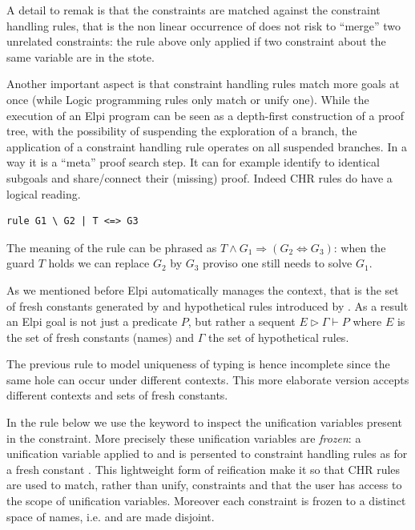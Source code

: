 \documentclass[a4paper, 11pt]{book}
\begin{document}
A detail to remak is that the constraints are matched against
the constraint handling rules, that is the non linear occurrence
of  does not risk to ``merge'' two unrelated constraints:
the rule above only applied if two constraint about the same variable
are in the stote.

Another important aspect is that constraint handling rules
match more goals at once (while Logic programming rules
only match or unify one). While the execution of an Elpi program
can be seen as a depth-first construction of a proof tree, with
the possibility of suspending the exploration of a branch, the
application of a constraint handling rule operates on all suspended
branches. In a way it is a ``meta'' proof search step. It can for
example identify to identical subgoals and share/connect their (missing)
proof. Indeed CHR rules do have a logical reading.

\begin{verbatim}
rule G1 \ G2 | T <=> G3
\end{verbatim}

The meaning of the rule can be phrased as $T \land G_1 \Rightarrow (G_2 \Leftrightarrow G_3)$:
when the guard $T$ holds we can replace $G_2$ by $G_3$ proviso one still
needs to solve $G_1$.
  
As we mentioned before Elpi automatically manages the context, that is
the set of fresh constants generated by  and hypothetical
rules introduced by \elpi{=>}. As a result an Elpi goal is
not just a predicate $P$, but rather a sequent $E \triangleright  \Gamma \vdash P$
where $E$ is the set of fresh constants (names) and $\Gamma$ the set of
hypothetical rules.

The previous rule to model uniqueness of typing is hence incomplete
since the same hole can occur under different contexts. This more
elaborate version accepts different contexts and sets of fresh constants.

In the rule below we use the keyword  to inspect the unification
variables present in the constraint. More precisely these unification variables
are \emph{frozen}: a unification variable  applied to  and
 is persented to constraint handling rules as 
for a fresh constant . This lightweight form of reification
make it so that CHR rules are used to match, rather than unify, constraints
and that the user has access to the scope of unification variables.
Moreover each constraint is frozen to a distinct space of names, i.e.
 and  are made disjoint.
\end{document}
